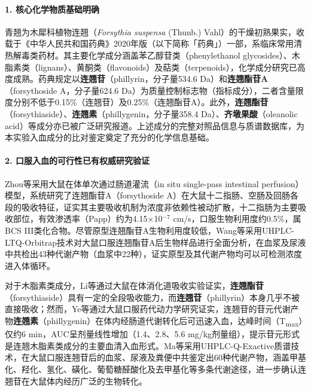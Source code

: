 \documentclass[12pt,a4paper,UTF8,scheme=chinese]{ctexart}
\newcommand{\compoundname}[1]{\textbf{#1}}
\newcommand{\herbname}[1]{\textit{#1}}
\begin{document}
\paragraph{1. 核心化学物质基础明确}

青翘为木犀科植物连翘（\herbname{Forsythia suspensa} (Thunb.) Vahl）的干燥初熟果实，收载于《中华人民共和国药典》2020年版（以下简称「药典」）一部，系临床常用清热解毒类药材。其主要化学成分涵盖苯乙醇苷类（phenylethanol glycosides）、木脂素类（lignans）、黄酮类（flavonoids）及萜类（terpenoids），化学成分研究已高度成熟。药典规定以\compoundname{连翘苷}（phillyrin，分子量534.6 Da）和\compoundname{连翘酯苷A}（forsythoside A，分子量624.6 Da）为质量控制标志物（指标成分），二者含量限度分别不低于0.15\%（连翘苷）及0.25\%（连翘酯苷A）。此外，\compoundname{连翘酯苷}（forsythiaside）、\compoundname{连翘素}（phillygenin，分子量358.4 Da）、\compoundname{齐墩果酸}（oleanolic acid）等成分亦已被广泛研究报道\cite{Review2021FA}。上述成分的完整对照品信息与质谱数据库，为本实验入血成分的比对鉴定奠定了充分的化学信息基础。

\paragraph{2. 口服入血的可行性已有权威研究验证}

Zhou等\cite{Zhou2012}采用大鼠在体单次通过肠道灌流（in situ single-pass intestinal perfusion）模型，系统研究了连翘酯苷A（forsythoside A）在大鼠十二指肠、空肠及回肠各段的吸收特征，证实其主要吸收机制为浓度非依赖性被动扩散，十二指肠为主要吸收部位，有效渗透率（Papp）约为4.15×10$^{-7}$ cm/s，口服生物利用度约0.5\%，属BCS III类化合物。尽管原型连翘酯苷A生物利用度较低，Wang等\cite{WangF2018}采用UHPLC-LTQ-Orbitrap技术对大鼠口服连翘酯苷A后生物样品进行全面分析，在血浆及尿液中共检出43种代谢产物（血浆中22种），证实原型及其代谢产物均可以可检测浓度进入体循环。

对于木脂素类成分，Li等\cite{Li2011F}通过大鼠在体消化道吸收实验证实，\compoundname{连翘酯苷}（forsythiaside）具有一定的全段吸收能力，而\compoundname{连翘苷}（phillyrin）本身几乎不被直接吸收；然而，Ye等\cite{Ye2013}通过大鼠口服药代动力学研究证实，连翘苷的苷元代谢产物\compoundname{连翘素}（phillygenin）在体内经肠道代谢转化后可迅速入血，达峰时间（T\textsubscript{max}）仅约6 min，AUC呈剂量线性增加（1.4、2.8、5.6 mg/kg剂量组），提示苷元形式是连翘木脂素类成分的主要血清入血形式。Ma等\cite{Ma2020}采用UHPLC-Q-Exactive质谱技术，在大鼠口服连翘苷后的血浆、尿液及粪便中共鉴定出60种代谢产物，涵盖甲基化、羟化、氢化、磺化、葡萄糖醛酸化及去甲基化等多条代谢途径，进一步确认连翘苷在大鼠体内经历广泛的生物转化。
\end{document}
